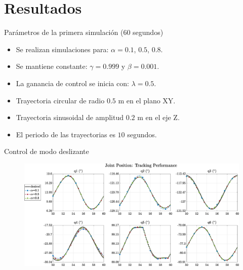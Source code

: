 \documentclass[10pt]{beamer} %
\begin{document}
	\section{Resultados}
	\begin{frame}[fragile]{Parámetros de la primera simulación ($60$ segundos)}
		\begin{minipage}{\textwidth}
			\large {} 
			\begin{itemize}
				\item Se realizan simulaciones para: $\alpha=0.1$, $0.5$, $0.8$.
				
				\item Se mantiene constante: $\gamma=0.999$ y $\beta=0.001$.
				
				\item La ganancia de control se inicia con: $\lambda=0.5$.
			\end{itemize}
		\color{white}{para crear espacio, borrar luego}	 
		\end{minipage}
	
		\begin{minipage}{\textwidth}		
			\large {}
			\begin{itemize}
				\item Trayectoria circular de radio $0.5$ m en el plano XY.
				
				\item Trayectoria sinusoidal de amplitud $0.2$ m en el eje Z.
				
				\item El periodo de las trayectorias es $10$ segundos.
			\end{itemize}
		\end{minipage}		
	\end{frame}
	
	
	\begin{frame}[fragile]{Control de modo deslizante}
		\begin{figure}
			\centering
			\hspace*{-0.7cm}\includegraphics[width=1.1\textwidth]{img/SMCi/circular_traj/60_seg/articular_SMCi_position_compare.eps}
		\end{figure}
	\end{frame}
	
\end{document}
